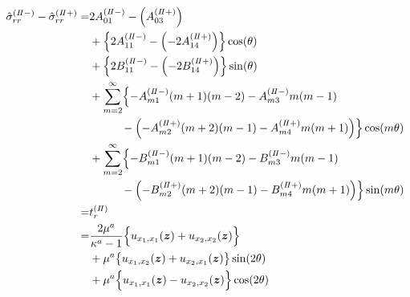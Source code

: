 \begin{align}
	\hat{\sigma}_{rr}^{(I\hspace{-.15em}I-)}-\hat{\sigma}_{rr}^{(I\hspace{-.15em}I+)} =
	&2A_{01}^{(I\hspace{-.15em}I-)}-\Bigl(A_{03}^{(I\hspace{-.15em}I+)}\Bigr)
	\nonumber
	\\
	&+\Bigl\{2A_{11}^{(I\hspace{-.15em}I-)}
	-\Bigl(-2A_{14}^{(I\hspace{-.15em}I+)}\Bigr)\Bigr\}\cos(\theta)
	\nonumber
	\\
	&+\Bigl\{2B_{11}^{(I\hspace{-.15em}I-)}
	-\Bigl(-2B_{14}^{(I\hspace{-.15em}I+)}\Bigr)\Bigr\}\sin(\theta)
	\nonumber
	\\
	&+\sum_{m=2}^{\infty}\Bigl\{
	-A_{m1}^{(I\hspace{-.15em}I-)}(m+1)(m-2)-A_{m3}^{(I\hspace{-.15em}I-)}m(m-1)
	\nonumber
	\\
	&\hspace{1.0cm}-\Bigl(-A_{m2}^{(I\hspace{-.15em}I+)}(m+2)(m-1)-A_{m4}^{(I\hspace{-.15em}I+)}m(m+1)\Bigr)
	\Bigr\}\cos(m\theta)
	\nonumber
	\\
	&+\sum_{m=2}^{\infty}\Bigl\{
	-B_{m1}^{(I\hspace{-.15em}I-)}(m+1)(m-2)-B_{m3}^{(I\hspace{-.15em}I-)}m(m-1)
	\nonumber
	\\
	&\hspace{1.0cm}-\Bigl(-B_{m2}^{(I\hspace{-.15em}I+)}(m+2)(m-1)-B_{m4}^{(I\hspace{-.15em}I+)}m(m+1)\Bigr)
	\Bigr\}\sin(m\theta)
	\nonumber
	\\
	=&t_{r}^{(I\hspace{-.15em}I)}
	\nonumber
	\\
		=&\frac{2\mu^a}{\kappa^a-1}\Bigl\{ u_{x_{1},x_{1}}(\bm{z})
			+ u_{x_{2},x_{2}}(\bm{z})\Bigr\}
			\nonumber
			\\
			&+\mu^a\bigl\{u_{x_{1},x_{2}}(\bm{z})
			+u_{x_{2},x_{1}}(\bm{z})\bigr\}\sin(2\theta)
			\nonumber
			\\
			&+\mu^a\Bigl\{ u_{x_{1},x_{1}}(\bm{z})
			- u_{x_{2},x_{2}}(\bm{z})\Bigr\}\cos(2\theta)
	\label{eq:SigmaRR2eq}
\end{align}

